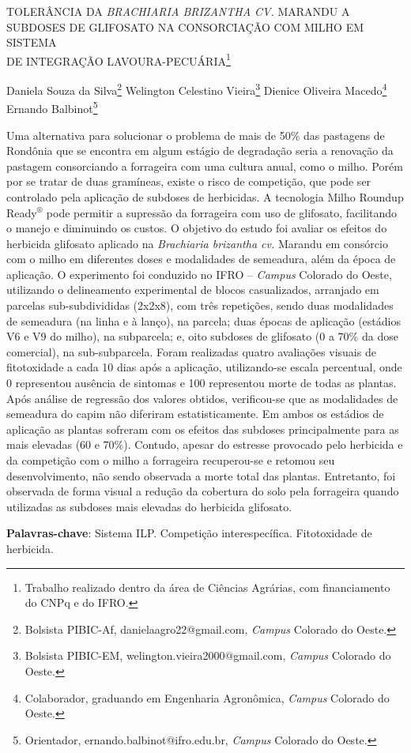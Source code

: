 \documentclass[article,12pt,onesidea,4paper,english,brazil]{abntex2}
\begin{document}
	
	
	\frenchspacing 
	
	\begin{center}
		\LARGE TOLERÂNCIA DA \textit{BRACHIARIA BRIZANTHA CV.} MARANDU A SUBDOSES DE GLIFOSATO NA CONSORCIAÇÃO COM MILHO EM SISTEMA\\DE INTEGRAÇÃO LAVOURA-PECUÁRIA\footnote{Trabalho realizado dentro da área de Ciências Agrárias, com financiamento do CNPq e do IFRO.}
		
		\normalsize
		Daniela Souza da Silva\footnote{Bolsista PIBIC-Af, danielaagro22@gmail.com, \textit{Campus} Colorado do Oeste.} 
		Welington Celestino Vieira\footnote{Bolsista PIBIC-EM, welington.vieira2000@gmail.com, \textit{Campus} Colorado do Oeste.} 
		Dienice Oliveira Macedo\footnote{Colaborador, graduando em Engenharia Agronômica, \textit{Campus} Colorado do Oeste.} 
		Ernando Balbinot\footnote{Orientador, ernando.balbinot@ifro.edu.br, \textit{Campus} Colorado do Oeste.} 
	\end{center}
	
	\noindent Uma alternativa para solucionar o problema de mais de 50\% das pastagens de
	Rondônia que se encontra em algum estágio de degradação seria a renovação da
	pastagem consorciando a forrageira com uma cultura anual, como o milho. Porém
	por se tratar de duas gramíneas, existe o risco de competição, que pode ser
	controlado pela aplicação de subdoses de herbicidas. A tecnologia Milho Roundup
	Ready$^{®}$ pode permitir a supressão da forrageira com uso de glifosato, facilitando o
	manejo e diminuindo os custos. O objetivo do estudo foi avaliar os efeitos do
	herbicida glifosato aplicado na \textit{Brachiaria brizantha cv.} Marandu em consórcio com
	o milho em diferentes doses e modalidades de semeadura, além da época de
	aplicação. O experimento foi conduzido no IFRO – \textit{Campus} Colorado do Oeste,
	utilizando o delineamento experimental de blocos casualizados, arranjado em
	parcelas sub-subdivididas (2x2x8), com três repetições, sendo duas modalidades
	de semeadura (na linha e à lanço), na parcela; duas épocas de aplicação (estádios
	V6 e V9 do milho), na subparcela; e, oito subdoses de glifosato (0 a 70\% da dose
	comercial), na sub-subparcela. Foram realizadas quatro avaliações visuais de
	fitotoxidade a cada 10 dias após a aplicação, utilizando-se escala percentual, onde
	0 representou ausência de sintomas e 100 representou morte de todas as plantas.
	Após análise de regressão dos valores obtidos, verificou-se que as modalidades de
	semeadura do capim não diferiram estatisticamente. Em ambos os estádios de
	aplicação as plantas sofreram com os efeitos das subdoses principalmente para as
	mais elevadas (60 e 70\%). Contudo, apesar do estresse provocado pelo herbicida e
	da competição com o milho a forrageira recuperou-se e retomou seu
	desenvolvimento, não sendo observada a morte total das plantas. Entretanto, foi
	observada de forma visual a redução da cobertura do solo pela forrageira quando
	utilizadas as subdoses mais elevadas do herbicida glifosato.
	
	\vspace{\onelineskip}
	
	\noindent
	\textbf{Palavras-chave}: Sistema ILP. Competição interespecífica. Fitotoxidade de
	herbicida.	
	
\end{document}
